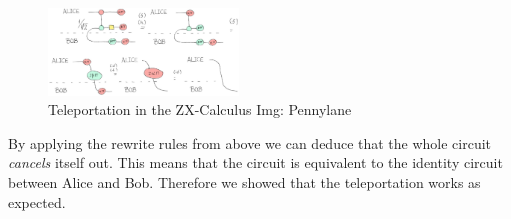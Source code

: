 \begin{figure}[h]
    \centering
    \includegraphics[width=0.45\textwidth]{images/teleportation.png}
    \caption{Teleportation in the ZX-Calculus Img: Pennylane\cite{pennylane2023zx}}
    \label{fig:teleportation}
\end{figure}

By applying the rewrite rules from above we can deduce that the whole circuit \textit{cancels} itself out. This means that the circuit is equivalent to the identity circuit between Alice and Bob. Therefore we showed that the teleportation works as expected.